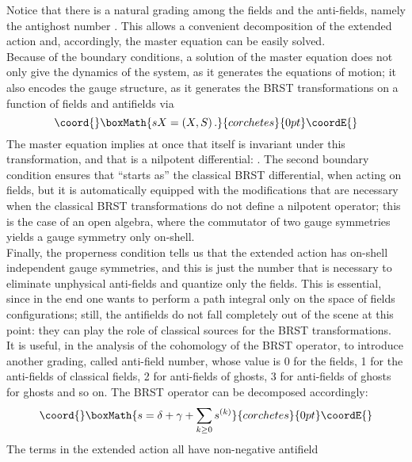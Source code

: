 \documentclass[a4paper,12pt]{article}
\begin{document}
Notice that there is a natural grading among the 
fields and the anti-fields, namely the antighost number
\cite{gomis}. This allows a convenient  
decomposition of the extended action and, accordingly, the master
equation can be easily solved. \\
Because of the boundary conditions, a solution of the master equation
does not only give the dynamics of the  
system, as it generates the equations of motion; it also encodes the
gauge structure, as it generates the BRST transformations on a
function \coordHE{} of fields and antifields via 
\begin{displaymath}\coord{}\boxMath{
  s X = (X,S) \, .
}{corchetes}{0pt}\coordE{}\end{displaymath}
The master equation implies at once that \coordHE{} itself is invariant under
this transformation, and that \coordHE{} is a nilpotent differential: \coordHE{}. The second boundary condition ensures that \coordHE{} ``starts as'' the
classical BRST differential, when acting on fields, but it is
automatically equipped with the modifications that are necessary when
the classical BRST transformations do not define a nilpotent operator;
this is the case of an open algebra, where the commutator of two gauge
symmetries
yields a gauge symmetry only on-shell. \\
Finally, the properness condition tells us that the extended action
has \coordHE{} on-shell independent gauge symmetries, and this is just the
number that is necessary to eliminate unphysical anti-fields and
quantize only the fields. This is essential, since in the end one
wants to perform a path integral only on the space of fields
configurations; still, the antifields do not fall completely out of
the scene at this point: they can play the role
of classical sources for the BRST transformations. \\
It is useful, in the analysis of the cohomology of the BRST operator,
to introduce another grading, called anti-field number, whose value is
0 for the fields, 1 for the anti-fields of classical fields, 2 for
anti-fields of ghosts, 3 for anti-fields of ghosts for ghosts and so on.
The BRST operator can be decomposed accordingly:
\begin{displaymath}\coord{}\boxMath{
  s = \delta + \gamma + \sum_{k \geq 0} s^{(k)} 
}{corchetes}{0pt}\coordE{}\end{displaymath}
The terms in the extended action all have non-negative antifield
\end{document}
